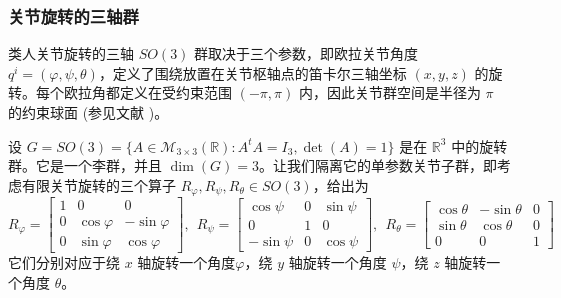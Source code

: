 \documentclass[11pt,fontset=founder]{ctexart}
\begin{document}
\subsubsection{关节旋转的三轴群}

类人关节旋转的三轴 $SO(3)$ 群取决于三个参数，即欧拉关节角度 $q^{i}=(\varphi ,\psi ,\theta )$，定义了围绕放置在关节枢轴点的笛卡尔三轴坐标 $(x,y,z)$ 的旋转。每个欧拉角都定义在受约束范围 $(-\pi ,\pi )$ 内，因此关节群空间是半径为 $\pi $ 的约束球面 (参见文献 \cite{SIAM,GaneshSprSml,GaneshSprBig,GaneshADG})。

设 $G=SO(3)=\{A\in \mathcal{M}_{3\times 3}(\mathbb{R}):A^{t}A=I_{3},\det
(A)=1\}$ 是在 $\mathbb{R}^{3}$ 中的旋转群。它是一个李群，并且 $\dim(G)=3$。让我们隔离它的单参数关节子群，即考虑有限关节旋转的三个算子 $R_{\varphi
},R_{\psi },R_{\theta }\in SO(3)$，给出为
\begin{equation*}
R_{\varphi } =\left[
\begin{array}{ccc}
1 & 0 & 0 \\
0 & \cos \varphi & -\sin \varphi \\
0 & \sin \varphi & \cos \varphi%
\end{array}
\right] , ~~ R_{\psi } =\left[
\begin{array}{ccc}
\cos \psi & 0 & \sin \psi \\
0 & 1 & 0 \\
-\sin \psi & 0 & \cos \psi%
\end{array}
\right] , ~~ R_{\theta } =\left[
\begin{array}{ccc}
\cos \theta & -\sin \theta & 0 \\
\sin \theta & \cos \theta & 0 \\
0 & 0 & 1%
\end{array}
\right]
\end{equation*}%
\noindent 它们分别对应于绕 $x$ 轴旋转一个角度$\varphi$，绕 $y$ 轴旋转一个角度 $\psi$，绕 $z$ 轴旋转一个角度 $\theta $。
\end{document}
